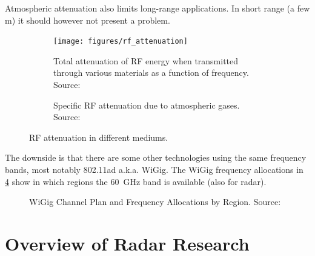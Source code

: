 Atmospheric attenuation also limits long-range applications. In short
range (a few \si{m}) it should however not present a problem.

\begin{figure}[htp]
    \centering
    \begin{subfigure}[b]{0.475\textwidth}
        \texttt{[image: figures/rf\_attenuation]}
        \caption{\label{fig:attenuation}Total attenuation of RF energy when transmitted through various materials as a function of frequency. Source: \cite{FerrisJr.1998}}
    \end{subfigure}
    \hfill
    \begin{subfigure}[b]{0.475\textwidth}
        \def\svgwidth{\linewidth} \footnotesize
        
        \caption{\label{fig:attenuation_air}Specific RF attenuation due to atmospheric gases. Source: \cite{ITU1997}\bigskip}
    \end{subfigure}
    \caption{RF attenuation in different mediums.}
\end{figure}

The downside is that there are some other technologies using the same
frequency bands, most notably 802.11ad a.k.a.
WiGig\cite{AgilentTechnologies2013}. The WiGig frequency allocations in
\cref{fig:wigig} show in which regions the \SI{60}{GHz} band is available (also
for radar).

\begin{figure}[htp]
    \centering
    \def\svgwidth{\linewidth}
    
    \caption{\label{fig:wigig}WiGig Channel Plan and Frequency Allocations by Region. Source: \cite{AgilentTechnologies2013}}
\end{figure}

\section{Overview of Radar Research}\label{overview-of-radar-research}

